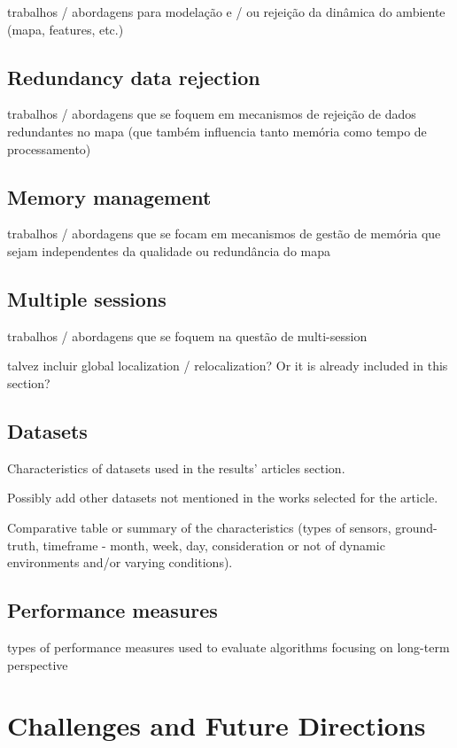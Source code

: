 \documentclass[10pt,a4paper,notitlepage,twocolumn,oneside]{article}
\begin{document}
trabalhos / abordagens para modelação e / ou rejeição da dinâmica do ambiente (mapa, features, etc.)

\subsection{Redundancy data rejection}

trabalhos / abordagens que se foquem em mecanismos de rejeição de dados redundantes no mapa (que também influencia tanto memória como tempo de processamento)

\subsection{Memory management}

trabalhos / abordagens que se focam em mecanismos de gestão de memória que sejam independentes da qualidade ou redundância do mapa

\subsection{Multiple sessions}

trabalhos / abordagens que se foquem na questão de multi-session

talvez incluir global localization / relocalization? Or it is already included in this section?

\subsection{Datasets}

Characteristics of datasets used in the results' articles section.

Possibly add other datasets not mentioned in the works selected for the article.

Comparative table or summary of the characteristics (types of sensors, ground-truth, timeframe - month, week, day, consideration or not of dynamic environments and/or varying conditions).

\subsection{Performance measures}

types of performance measures used to evaluate algorithms focusing on long-term perspective

\section{Challenges and Future Directions}
\label{sec:challenges:future}
\end{document}
